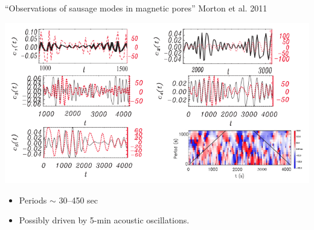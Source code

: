 \documentclass[11pt,table]{beamer}
\begin{document}
\begin{frame}[t]{``Observations of sausage modes in magnetic pores''}
    {Morton et al. 2011}
    \begin{block}{}
        \includegraphics[width=\textwidth]{saus2.png}
    \end{block}
    \begin{block}{}
        \begin{itemize}
            \item Periods $\sim$ 30--450 sec
            \item Possibly driven by 5-min acoustic oscillations.
        \end{itemize}
    \end{block}
\end{frame}%
\end{document}
